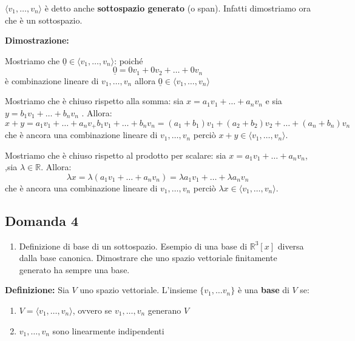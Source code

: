 \documentclass[
  a4paper,
]{article}
\providecommand{\tightlist}{%
  \setlength{\itemsep}{0pt}\setlength{\parskip}{0pt}}
\providecommand{\tightlist}{}
\begin{document}
\(\langle v_1,\ldots,v_n\rangle\) è detto anche \textbf{sottospazio
generato} (o span). Infatti dimostriamo ora che è un sottospazio.

\textbf{Dimostrazione:}

Mostriamo che \(\underline{0} \in \langle v_1,\ldots,v_n\rangle\):
poiché \[
\underline{0} = 0 v_1 + 0 v_2 + \dots + 0 v_n
\] è combinazione lineare di \(v_1, \dots, v_n\) allora
\(\underline{0} \in \langle v_1,\ldots,v_n\rangle\)

Mostriamo che è chiuso rispetto alla somma: sia
\(x = a_1 v_1 + \dots + a_n v_n\) e sia
\(y = b_1 v_1 + \dots + b_n v_n\) . Allora: \[
x + y = a_1 v_1 + \dots + a_n v_ +  b_1 v_1 + \dots + b_n v_n = (a_1 + b_1)v_1 + (a_2 + b_2) v_2 + \dots + (a_n + b_n) v_n
\] che è ancora una combinazione lineare di \(v_1, \dots, v_n\) perciò
\(x + y \in \langle v_1,\ldots,v_n\rangle\).

Mostriamo che è chiuso rispetto al prodotto per scalare: sia
\(x = a_1 v_1 + \dots + a_n v_n\), ,sia \(\lambda \in \mathbb{R}\).
Allora: \[
\lambda x = \lambda (a_1 v_1 + \dots + a_n v_n) = \lambda a_1 v_1 + \dots + \lambda a_n v_n
\] che è ancora una combinazione lineare di \(v_1, \dots, v_n\) perciò
\(\lambda x \in \langle v_1,\ldots,v_n\rangle\).

\hypertarget{domanda-4}{%
\subsection{Domanda 4}\label{domanda-4}}

\begin{observationbox}[Domanda]
\begin{enumerate}
\def\labelenumi{\arabic{enumi}.}
\setcounter{enumi}{3}
\tightlist
\item
  Definizione di base di un sottospazio. Esempio di una base di
  \(\mathbb{R}^3[x]\) diversa dalla base canonica. Dimostrare che uno
  spazio vettoriale finitamente generato ha sempre una base.
\end{enumerate}
\end{observationbox}

\textbf{Definizione:} Sia \(V\) uno spazio vettoriale. L'insieme
\(\{v_1, \dots v_n\}\) è una \textbf{base} di \(V\) se:

\begin{enumerate}
\def\labelenumi{\arabic{enumi}.}
\tightlist
\item
  \(V = \langle v_1, \dots , v_n\rangle\), ovvero se \(v_1, \dots, v_n\)
  generano \(V\)
\item
  \(v_1, \dots, v_n\) sono linearmente indipendenti
\end{enumerate}
\end{document}
